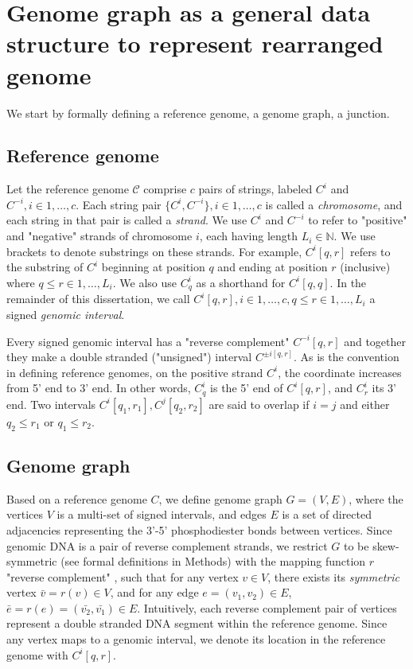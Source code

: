 \documentclass[phd,tocprelim]{cornell}
\begin{document}
\section{Genome graph as a general data structure to represent rearranged genome}
We start by formally defining a reference genome, a genome graph, a junction.

\subsection{Reference genome}
Let the reference genome $\mathcal{C}$ comprise $c$ pairs of strings, labeled $C^i$ and $C^{-i}, i \in 1,\dots,c$. Each string pair $\{C^i, C^{-i}\}, i \in 1,\dots, c$ is called a \textit{chromosome}, and each string in that pair is called a \textit{strand}. We use $C^i$ and $C^{-i}$ to refer to "positive" and "negative" strands of chromosome $i$, each having length $L_i \in \mathbb{N}$. We use brackets to denote substrings on these strands. For example, $C^{i}[q,r]$ refers to the substring of $C^{i}$ beginning at position $q$ and ending at position $r$ (inclusive) where $q \le r \in 1,\dots,L_i$. We also use $C^{i}_q$ as a shorthand for $C^{i}[q,q]$. In the remainder of this dissertation, we call $C^{i}[q,r], i \in 1, \dots, c, q \le r \in 1, \dots, L_i$ a signed \textit{genomic interval}. 

Every signed genomic interval has a "reverse complement" $C^{-i}[q,r]$ and together they make a double stranded ("unsigned") interval $C^{\pm{i}[q,r]}$. As is the convention in defining reference genomes, on the positive strand $C^i$, the coordinate increases from 5' end to 3' end. In other words, $C^{i}_q$ is the 5' end of $C^{i}[q,r]$, and $C^{i}_r$ its 3' end. Two intervals $C^{i}[q_1, r_1], C^{j}[q_2, r_2]$ are said to overlap if $i = j$ and either $q_2 \le r_1$ or $q_1 \le r_2$.

\subsection{Genome graph}
Based on a reference genome $C$, we define genome graph $G = (V, E)$, where the vertices $V$ is a multi-set of signed intervals, and edges $E$ is a set of directed adjacencies representing the 3'-5' phosphodiester bonds between vertices. Since genomic DNA is a pair of reverse complement strands, we restrict $G$ to be skew-symmetric (see formal definitions in Methods) with the mapping function $r$ "reverse complement"  \cite{Goldberg1996-qm}, such that for any vertex $v \in V$, there exists its \textit{symmetric} vertex $\bar{v} = r(v) \in V$, and for any edge $e = (v_1, v_2) \in E$, $\bar{e} = r(e) = (\bar{v_2}, \bar{v_1}) \in E$. Intuitively, each reverse complement pair of vertices represent a double stranded DNA segment within the reference genome. Since any vertex maps to a genomic interval, we denote its location in the reference genome with $C^{i}[q,r]$.
\end{document}

